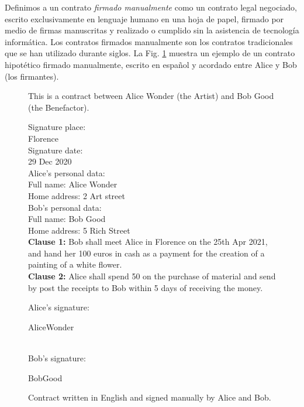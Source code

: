 \documentclass[12pt]{report} %
\begin{document}
	Definimos a un contrato \emph{firmado manualmente} como un contrato legal negociado, escrito exclusivamente en lenguaje humano en una hoja de papel, firmado por medio de firmas manuscritas y realizado o cumplido sin la asistencia de tecnología informática. Los contratos firmados manualmente son los contratos tradicionales que se han utilizado durante siglos. La Fig. \ref{box:contengsignmanual} muestra un ejemplo de un contrato hipotético firmado manualmente, escrito en español y acordado entre Alice y Bob (los firmantes). 
	
	
\begin{figure}
\begin{tcolorbox}[width=\textwidth,
   title={This is a contract between Alice and Bob.},
   colframe=black!75!white,
   colbacktitle=green!50!white, coltitle=black,
   colupper=black,    colback=green!10!white]

 This is a contract  between Alice Wonder (the Artist) 
 and Bob Good (the Benefactor). 

\vspace{0.5cm}
Signature place: \\
Florence\\

Signature date:\\ 
29 Dec 2020 \\

Alice's personal data: \\
Full name:  Alice Wonder \\
Home address: 2 Art street \\

Bob's personal data: \\
Full name: Bob Good \\
Home address: 5 Rich Street \\



\textbf{Clause 1:} Bob shall meet Alice in Florence 
on the 25th Apr 2021, and hand her 100 
euros in cash as a  payment for the creation 
of a painting of a white flower. \\

\textbf{Clause 2:} Alice shall spend 50 on the 
purchase of material and send by post the receipts 
to Bob within 5 days of receiving the money.

\vspace{0.5 cm}
Alice's signature: \begin{wedn}AliceWonder\end{wedn} \\
      
Bob's signature: \begin{wedn}BobGood\end{wedn}

\end{tcolorbox}
\caption{Contract written in English and signed 
manually by Alice and Bob.}
\label{box:contengsignmanual}
\end{figure}
\end{document}
